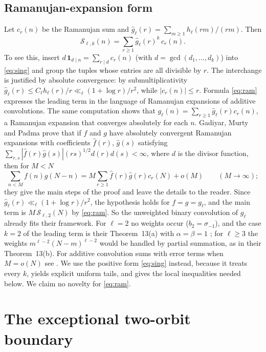 \documentclass[11pt,a4paper]{article}
\theoremstyle{remark}
\numberwithin{equation}{section}
\newcommand{\Sing}{\mathcal S}
\newcommand{\one}{\mathbf 1}
\begin{document}
\subsection{Ramanujan-expansion form}\label{sec:ramanujan}
Let $c_r(n)$ be the Ramanujan sum and $\widehat g_\ell(r)=\sum_{m\ge1}h_\ell(rm)/(rm)$. Then
\begin{equation}\label{eq:ram}
\Sing_{\ell,k}(n)=\sum_{r\ge1}\widehat g_\ell(r)^k\,c_r(n).
\end{equation}
To see this, insert $d\,\one_{d\mid n}=\sum_{r\mid d}c_r(n)$ (with $d=\gcd(d_1,\ldots,d_k)$) into \eqref{eq:sing} and group the tuples whose entries are all divisible by $r$. The interchange is justified by absolute convergence: by submultiplicativity $\widehat g_\ell(r)\le C_\ell h_\ell(r)/r\ll_\ell(1+\log r)/r^2$, while $|c_r(n)|\le r$. Formula \eqref{eq:ram} expresses the leading term in the language of Ramanujan expansions of additive convolutions. The same computation shows that $g_\ell(n)=\sum_{r\ge1}\widehat g_\ell(r)c_r(n)$, a Ramanujan expansion that converges absolutely for each $n$. Gadiyar, Murty and Padma \cite[Theorem~10]{GMP} prove that if $f$ and $g$ have absolutely convergent Ramanujan expansions with coefficients $\widehat f(r)$, $\widehat g(s)$ satisfying $\sum_{r,s}|\widehat f(r)\widehat g(s)|(rs)^{1/2}d(r)d(s)<\infty$, where $d$ is the divisor function, then for $M<N$
\[
\sum_{n<M}f(n)g(N-n)=M\sum_{r\ge1}\widehat f(r)\widehat g(r)c_r(N)+o(M)\qquad(M\to\infty);
\]
they give the main steps of the proof and leave the details to the reader. Since $\widehat g_\ell(r)\ll_\ell(1+\log r)/r^2$, the hypothesis holds for $f=g=g_\ell$, and the main term is $M\,\Sing_{\ell,2}(N)$ by \eqref{eq:ram}. So the unweighted binary convolution of $g_\ell$ already fits their framework. For $\ell=2$ no weights occur ($b_2=\sigma_{-1}$), and the case $k=2$ of the leading term is their Theorem~13(a) with $\alpha=\beta=1$ \cite{GMP}; for $\ell\ge3$ the weights $m^{\ell-2}(N-m)^{\ell-2}$ would be handled by partial summation, as in their Theorem~13(b). For additive convolution sums with error terms when $M=o(N)$ see \cite{MSS}. We use the positive form \eqref{eq:sing} instead, because it treats every $k$, yields explicit uniform tails, and gives the local inequalities needed below. We claim no novelty for \eqref{eq:ram}.

\section{The exceptional two-orbit boundary}\label{sec:two}
\end{document}
